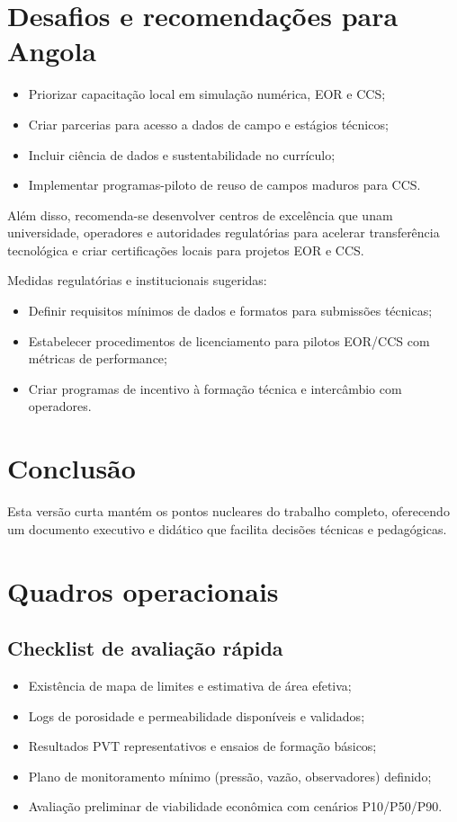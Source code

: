 \documentclass[
  12pt,
  a4paper,
  oneside,
  brazilian,
  sumario=tradicional
]{abntex2}
\begin{document}
\chapter{Desafios e recomendações para Angola}
\begin{itemize}
  \item Priorizar capacitação local em simulação numérica, EOR e CCS;
  \item Criar parcerias para acesso a dados de campo e estágios técnicos;
  \item Incluir ciência de dados e sustentabilidade no currículo;
  \item Implementar programas-piloto de reuso de campos maduros para CCS.
\end{itemize}

Além disso, recomenda-se desenvolver centros de excelência que unam universidade,
operadores e autoridades regulatórias para acelerar transferência tecnológica e
criar certificações locais para projetos EOR e CCS.

Medidas regulatórias e institucionais sugeridas:
\begin{itemize}
  \item Definir requisitos mínimos de dados e formatos para submissões técnicas;
  \item Estabelecer procedimentos de licenciamento para pilotos EOR/CCS com métricas de performance;
  \item Criar programas de incentivo à formação técnica e intercâmbio com operadores.
\end{itemize}

\chapter{Conclusão}
Esta versão curta mantém os pontos nucleares do trabalho completo, oferecendo
um documento executivo e didático que facilita decisões técnicas e pedagógicas.

\chapter{Quadros operacionais}
\section{Checklist de avaliação rápida}
\begin{itemize}
  \item Existência de mapa de limites e estimativa de área efetiva;
  \item Logs de porosidade e permeabilidade disponíveis e validados;
  \item Resultados PVT representativos e ensaios de formação básicos;
  \item Plano de monitoramento mínimo (pressão, vazão, observadores) definido;
  \item Avaliação preliminar de viabilidade econômica com cenários P10/P50/P90.
\end{itemize}
\end{document}
